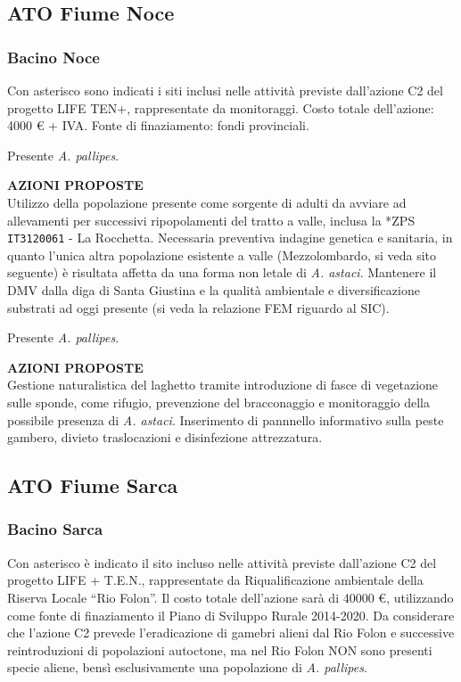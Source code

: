 \documentclass[11pt,a4paper,italian,twoside,openany]{memoir}
\begin{document}
\subsection{ATO Fiume Noce}
\subsubsection{Bacino Noce} 
Con asterisco sono indicati i siti inclusi nelle attività previste dall’azione C2 del progetto LIFE TEN+, rappresentate da monitoraggi. Costo totale dell’azione: 4000 € + IVA. Fonte di finaziamento: fondi provinciali.

\begin{description}\itemsep0pt
  \item[*ZSC- \texttt{IT3120060} - Forra di Santa Giustina] Presente \emph{A. pallipes}.

  \textbf{AZIONI PROPOSTE}\\

  Utilizzo della popolazione presente come sorgente di adulti da avviare ad allevamenti per successivi  ripopolamenti del tratto a valle, inclusa la *ZPS \texttt{IT3120061} - La Rocchetta. Necessaria preventiva indagine genetica e sanitaria, in quanto l’unica altra popolazione esistente a valle (Mezzolombardo, si veda sito seguente)  è risultata affetta da una forma non letale di \emph{A. astaci}. Mantenere il DMV dalla diga di Santa Giustina e la qualità ambientale e diversificazione substrati ad oggi presente (si veda la relazione FEM riguardo al SIC).

  \item[Laghetto di Mezzocorona] Presente \emph{A. pallipes}. 

  \textbf{AZIONI PROPOSTE}\\

  Gestione naturalistica del laghetto tramite introduzione di fasce di vegetazione sulle sponde, come rifugio, prevenzione del bracconaggio e monitoraggio della possibile presenza di \emph{A. astaci}. Inserimento di pannnello informativo sulla peste gambero, divieto traslocazioni e disinfezione attrezzatura.
\end{description}

\subsection{ATO Fiume Sarca} 
\subsubsection{Bacino Sarca}
Con asterisco è indicato il sito incluso nelle attività previste dall’azione C2 del progetto LIFE + T.E.N., rappresentate da Riqualificazione ambientale della Riserva Locale “Rio Folon”. Il costo totale dell’azione sarà di 40000 €, utilizzando come fonte di finaziamento il Piano di Sviluppo Rurale 2014-2020. Da considerare che l’azione C2 prevede l'eradicazione di gamebri alieni dal Rio Folon e successive reintroduzioni di popolazioni autoctone, ma nel Rio Folon NON sono presenti specie aliene, bensì esclusivamente una popolazione di \emph{A. pallipes}.
\end{document}
